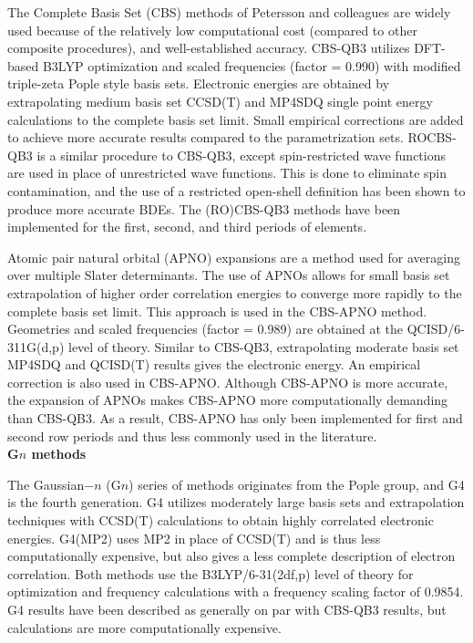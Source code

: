 The Complete Basis Set (CBS) methods of Petersson and colleagues\cite{Montgomery1999, Montgomery2000, Ochterski1996, Wood2006} are widely used because of the relatively low computational cost (compared to other composite procedures), and well-established accuracy.\cite{Somers2015, Simmie2015} CBS-QB3\cite{Montgomery1999, Montgomery2000} utilizes DFT-based B3LYP optimization and scaled frequencies (factor = 0.990) with modified triple-zeta Pople style basis sets. Electronic energies are obtained by extrapolating medium basis set CCSD(T) and MP4SDQ single point energy calculations to the complete basis set limit. Small empirical corrections are added to achieve more accurate results compared to the parametrization sets.\cite{Petersson2001} ROCBS-QB3 is a similar procedure to CBS-QB3, except spin-restricted wave functions are used in place of unrestricted wave functions. This is done to eliminate spin contamination, and the use of a restricted open-shell definition has been shown to produce more accurate BDEs.\cite{DiLabio1999} The (RO)CBS-QB3 methods have been implemented for the first, second, and third periods of elements.

Atomic pair natural orbital (APNO) expansions are a method used for averaging over multiple Slater determinants. The use of APNOs allows for small basis set extrapolation of higher order correlation energies to converge more rapidly to the complete basis set limit. This approach is used in the CBS-APNO method.\cite{Ochterski1996} Geometries and scaled frequencies (factor = 0.989) are obtained at the QCISD/6-311G(d,p) level of theory. Similar to CBS-QB3, extrapolating moderate basis set MP4SDQ and QCISD(T) results gives the electronic energy. An empirical correction is also used in CBS-APNO. Although CBS-APNO is more accurate, the expansion of APNOs makes CBS-APNO more computationally demanding than CBS-QB3. As a result, CBS-APNO has only been implemented for first and second row periods and thus less commonly used in the literature.
\\

\noindent \textbf{G$n$ methods}

The Gaussian$-n$ (G$n$) series of methods originates from the Pople group,\cite{Pople1989} and G4 is the fourth generation. G4 utilizes moderately large basis sets and extrapolation techniques with CCSD(T) calculations to obtain highly correlated electronic energies. G4(MP2) uses MP2 in place of CCSD(T) and is thus less computationally expensive, but also gives a less complete description of electron correlation. Both methods use the B3LYP/6-31(2df,p) level of theory for optimization and frequency calculations with a frequency scaling factor of 0.9854. G4 results have been described as generally on par with CBS-QB3 results,\cite{Somers2015, Simmie2015} but calculations are more computationally expensive.

